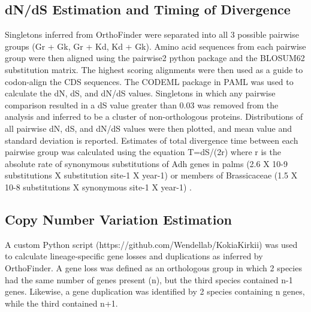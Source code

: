 \documentclass[10pt,letterpaper]{article}
\newcommand{\note}[2][]{\added[id=#1,remark={#2}]{}}
\begin{document}
\subsection*{dN/dS Estimation and Timing of Divergence}

Singletons inferred from OrthoFinder were separated into all 3 possible pairwise
groups (Gr + Gk, Gr + Kd, Kd + Gk). Amino acid sequences from each pairwise
group were then aligned using the pairwise2 python package and the BLOSUM62
substitution matrix. The highest scoring alignments were then used as a guide to
codon-align the CDS sequences. The CODEML package in PAML \cite{Yang2007} was
used to calculate the dN, dS, and dN/dS values. Singletons in which any pairwise
comparison resulted in a dS value greater than 0.03\note[Justin]{May need to
  adjust after doing said analysis}\note[Corrinne]{What was our justification
  for this again?} was removed from the analysis and inferred to be a cluster of
non-orthologous proteins. Distributions of all pairwise dN, dS, and dN/dS values
were then plotted, and mean value and standard deviation is reported. Estimates
of total divergence time between each pairwise group was calculated using the
equation T=dS/(2r) where r is the absolute rate of synonymous substitutions of
Adh genes in palms (2.6 X 10-9 substitutions X substitution site-1 X year-1)
\cite{Cronn2002, Morton1996} or members of Brassicaceae (1.5 X 10-8
substitutions X synonymous site-1 X year-1) \cite{Koch2000}.


\subsection*{Copy Number Variation Estimation}
A custom Python script (https://github.com/Wendellab/KokiaKirkii) was used to
calculate lineage-specific gene losses and duplications as inferred by
OrthoFinder. A gene loss was defined as an orthologous group in which 2 species
had the same number of genes present (n), but the third species contained n-1
genes. Likewise, a gene duplication was identified by 2 species containing n
genes, while the third contained n+1.\note[Justin]{Very rough estimate of gene
  loss and duplication; do we want more sophisticated method? Other parts to
  this section?}\note[Corrinne]{We probably should cross-check these to make
  sure things didn’t get screwed up, e.g., a gene “loss” is actually where
  something got thrown in as a “duplication” or as a loner (true singleton with
  no match in other genomes)}
\end{document}
